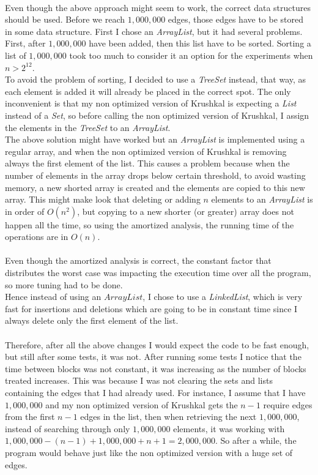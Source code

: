 \documentclass[tikz, 12pt]{scrartcl}
\begin{document}
\\
Even though the above approach might seem to work, the correct data structures should be used. Before we reach $1,000,000$ edges, those edges have to be stored in some data structure. First I chose an \textit{ArrayList}, but it had several problems. First, after $1,000,000$ have been added, then this list have to be sorted. Sorting a list of $1,000,000$ took too much to consider it an option for the experiments when $n > 2^{12}$. \\
To avoid the problem of sorting, I decided to use a \textit{TreeSet} instead, that way, as each element is added it will already be placed in the correct spot. The only inconvenient is that my non optimized version of Krushkal is expecting a \textit{List} instead of a \textit{Set}, so before calling the non optimized version of Krushkal, I assign the elements in the \textit{TreeSet} to an \textit{ArrayList}.\\
The above solution might have worked but an \textit{ArrayList} is implemented using a regular array, and when the non optimized version of Krushkal is removing always the first element of the list. This causes a problem because when the number of elements in the array drops below certain threshold, to avoid wasting memory, a new shorted array is created and the elements are copied to this new array. This might make look that deleting or adding $n$ elements to an \textit{ArrayList} is in order of $O(n^2)$, but copying to a new shorter (or greater) array does not happen all the time, so using the amortized analysis, the running time of the operations are in $O(n)$.\\
\\
Even though the amortized analysis is correct, the constant factor that distributes the worst case was impacting the execution time over all the program, so more tuning had to be done.\\
Hence instead of using an $\textit{ArrayList}$, I chose to use a \textit{LinkedList}, which is very fast for insertions and deletions which are going to be in constant time since I always delete only the first element of the list.\\
\\
Therefore, after all the above changes I would expect the code to be fast enough, but still after some tests, it was not. After running some tests I notice that the time between blocks was not constant, it was increasing as the number of blocks treated increases. This was because I was not clearing the sets and lists containing the edges that I had already used. For instance, I assume that I have $1,000,000$ and my non optimized version of Krushkal gets the $n - 1$ require edges from the first $n - 1$ edges in the list, then when retrieving the next $1,000,000$, instead of searching through only $1,000,000$ elements, it was working with $1,000,000 - (n -1) + 1,000,000 + n + 1 = 2,000,000$. So after a while, the program would behave just like the non optimized version with a huge set of edges.\\
\end{document}
